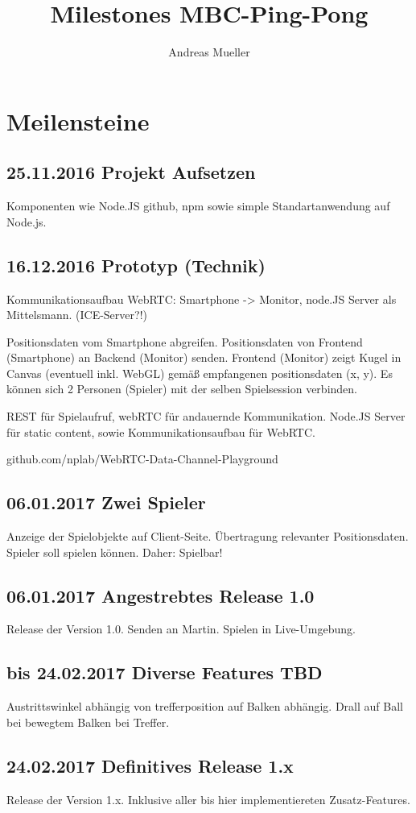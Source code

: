 \documentclass[12pt,a4paper]{article}
\author{Andreas Mueller}
\title{Milestones MBC-Ping-Pong}
\begin{document}
\maketitle
\newpage
\tableofcontents
\newpage

\section{Meilensteine}
\subsection{25.11.2016 Projekt Aufsetzen}
Komponenten wie Node.JS github, npm sowie simple Standartanwendung auf Node.js.

\subsection{16.12.2016 Prototyp (Technik)}
Kommunikationsaufbau WebRTC: Smartphone -> Monitor, node.JS Server als Mittelsmann. (ICE-Server?!)

Positionsdaten vom Smartphone abgreifen.
Positionsdaten von Frontend (Smartphone) an Backend (Monitor) senden.
Frontend (Monitor) zeigt Kugel in Canvas (eventuell inkl. WebGL) gemäß empfangenen positionsdaten (x, y).
Es können sich 2 Personen (Spieler) mit der selben Spielsession verbinden.

REST für Spielaufruf, webRTC für andauernde Kommunikation.
Node.JS Server für static content,
sowie Kommunikationsaufbau für WebRTC.

github.com/nplab/WebRTC-Data-Channel-Playground

\subsection{06.01.2017 Zwei Spieler}
Anzeige der Spielobjekte auf Client-Seite.
Übertragung relevanter Positionsdaten.
Spieler soll spielen können.
Daher: Spielbar!

\subsection{06.01.2017 Angestrebtes Release 1.0}
Release der Version 1.0.
Senden an Martin.
Spielen in Live-Umgebung.

\subsection{bis 24.02.2017 Diverse Features TBD}
Austrittswinkel abhängig von trefferposition auf Balken abhängig.
Drall auf Ball bei bewegtem Balken bei Treffer.

\subsection{24.02.2017 Definitives Release 1.x}
Release der Version 1.x.
Inklusive aller bis hier implementiereten Zusatz-Features.
\end{document}
